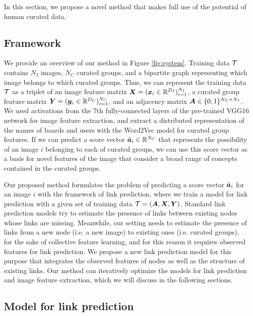 \documentclass[letterpaper]{article} %
\begin{document}
In this section, we propose a novel method that makes full use of the potential of human curated data.

\subsection{Framework}
\label{sec:proposed:framework}
\indent

We provide an overview of our method in Figure \ref{fig:system}.
%
Training data $\mathcal T$ contains $N_I$ images, $N_C$ curated groups, and a bipartite graph representing which image belongs to which curated groups.
%
Thus, we can represent the training data $\mathcal T$ as a triplet of an image feature matrix $\bm{X}=(\bm{x}_i\in\mathbb R^{D_I})_{i=1}^{N_I}$, a curated group feature matrix $\bm{Y}=(\bm{y}_c\in\mathbb R^{D_C})_{c=1}^{N_C}$, and an adjacency matrix $\bm{A}\in\{0,1\}^{N_C\times N_I}$.
%
We used activations from the 7th fully-connected layers of the pre-trained VGG16 network \cite{Simonyan2014} for image feature extraction, and extract a distributed representation of the names of boards and users with the Word2Vec model \cite{Mikolov2013} for curated group features.
%
If we can predict a score vector $\hat{\bm{a}}_i\in\mathbb R^{N_C}$ that represents the possibility of an image $i$ belonging to each of curated groups, we can use this score vector as a basis for novel features of the image that consider a broad range of concepts contained in the curated groups.

Our proposed method formulates the problem of predicting a score vector $\hat{\bm{a}}_i$ for an image $i$ with the framework of link prediction, where we train a model for link prediction with a given set of training data $\mathcal T=(\bm{A},\bm{X},\bm{Y})$.
%
Standard link prediction models try to estimate the presence of links between existing nodes whose links are missing.
%
Meanwhile, our setting needs to estimate the presence of links from a new node (i.e. a new image) to existing ones (i.e. curated groups), for the sake of collective feature learning, and for this reason it requires observed features for link prediction.
%
We propose a new link prediction model for this purpose that integrates the observed features of nodes as well as the structure of existing links.
%
Our method can iteratively optimize the models for link prediction and image feature extraction, which we will discuss in the following sections.

\subsection{Model for link prediction}
\label{sec:proposed:link}
\indent
\end{document}
